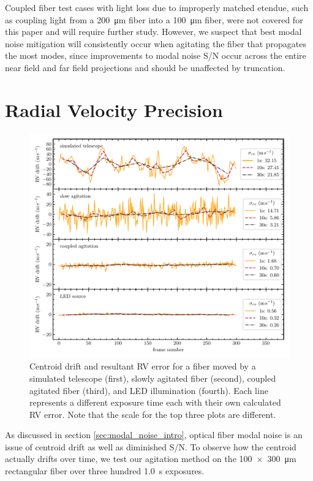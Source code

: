 \documentclass[twocolumn]{emulateapj}
\begin{document}
Coupled fiber test cases with light loss due to improperly matched etendue, such as coupling light from a \SI{200}{\micro\meter} fiber into a \SI{100}{\micro\meter} fiber, were not covered for this paper and will require further study. However, we suspect that best modal noise mitigation will consistently occur when agitating the fiber that propagates the most modes, since improvements to modal noise S/N occur across the entire near field and far field projections and should be unaffected by truncation.

\section{Radial Velocity Precision}
\label{sec:rv_precision}

\begin{figure}
\centering
	\includegraphics[width=\textwidth]{images/rv_error.pdf}
	\caption{Centroid drift and resultant RV error for a fiber moved by a simulated telescope (first), slowly agitated fiber (second), coupled agitated fiber (third), and LED illumination (fourth). Each line represents a different exposure time each with their own calculated RV error. Note that the scale for the top three plots are different.}
\label{fig:rv_error}
\end{figure}

As discussed in section \ref{sec:modal_noise_intro}, optical fiber modal noise is an issue of centroid drift as well as diminished S/N. To observe how the centroid actually drifts over time, we test our agitation method on the \SI{100x300}{\micro\meter} rectangular fiber over three hundred \SI{1.0}{\second} exposures.
\end{document}
